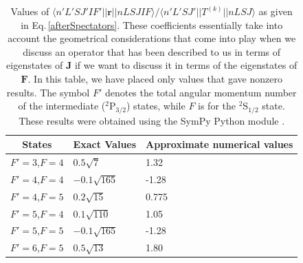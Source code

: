\begin{table}[h!]
\centering
\begin{tabular}{|c|l|l|}
\hline
States & Exact Values & Approximate numerical values\\
\hline
$F'=3$,$F=4$&$0.5 \sqrt{7}$&1.32\\ 
$F'=4$,$F=4$&$- 0.1 \sqrt{165}$&-1.28\\ 
$F'=4$,$F=5$&$0.2 \sqrt{15}$&0.775\\ 
$F'=5$,$F=4$&$0.1 \sqrt{110}$&1.05\\ 
$F'=5$,$F=5$&$- 0.1 \sqrt{165}$&-1.28\\ 
$F'=6$,$F=5$&$0.5 \sqrt{13}$&1.80\\ 
\hline
\end{tabular}
\caption{Values of $\langle n' L' S J' I F' ||\mathbf{r}||n L S J I F\rangle / \langle n'L' S J'||T^{(k)}|| n L S J\rangle$ as given in Eq.\,\ref{afterSpectators}. These coefficients essentially take into account the geometrical considerations that come into play when we discuss an operator that has been described to us in terms of eigenstates of $\mathbf{J}$ if we want to discuss it in terms of the eigenstates of $\mathbf{F}$. In this table, we have placed only values that gave nonzero results. The symbol $F'$ denotes the total angular momentum number of the intermediate ($^2$P$_{3/2}$) states, while $F$ is for the $^2$S$_{1/2}$ state. These results were obtained using the SymPy Python module \cite{sympy}\cite{rasch6j}.
\label{coefficient_calculated}}
\end{table}

